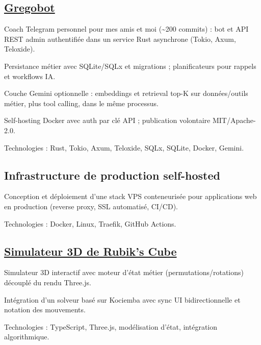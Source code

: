 \subsection{\href{https://github.com/Wuraim/gregobot-oss}{Gregobot}}

\begin{zitemize}
    \item Coach Telegram personnel pour mes amis et moi (\textasciitilde200 commits) : bot et API REST admin authentifiée dans un service Rust asynchrone (Tokio, Axum, Teloxide).
    \item Persistance métier avec SQLite/SQLx et migrations ; planificateurs pour rappels et workflows IA.
    \item Couche Gemini optionnelle : embeddings et retrieval top-K sur données/outils métier, plus tool calling, dans le même processus.
    \item Self-hosting Docker avec auth par clé API ; publication volontaire MIT/Apache-2.0.
    \item Technologies : Rust, Tokio, Axum, Teloxide, SQLx, SQLite, Docker, Gemini.
\end{zitemize}

\vspace{6pt}

\subsection{{Infrastructure de production self-hosted}}

\begin{zitemize}
    \item Conception et déploiement d'une stack VPS conteneurisée pour applications web en production (reverse proxy, SSL automatisé, CI/CD).
    \item Technologies : Docker, Linux, Traefik, GitHub Actions.
\end{zitemize}

\vspace{6pt}

\subsection{\href{https://rubikscube.gregoirelorgnier.me/}{Simulateur 3D de Rubik's Cube}}

\begin{zitemize}
    \item Simulateur 3D interactif avec moteur d'état métier (permutations/rotations) découplé du rendu Three.js.
    \item Intégration d'un solveur basé sur Kociemba avec sync UI bidirectionnelle et notation des mouvements.
    \item Technologies : TypeScript, Three.js, modélisation d'état, intégration algorithmique.
\end{zitemize}
